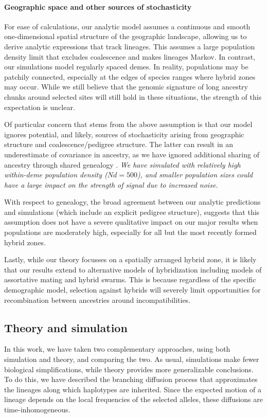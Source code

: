 \documentclass[11pt,letterpaper]{article}
\newcommand{\alisa}[1]{{\em \color{red} #1}}
\begin{document}
\paragraph{Geographic space and other sources of stochasticity}
For ease of calculations, our analytic model assumes a continuous and smooth one-dimensional spatial structure of the geographic landscape, allowing us to derive analytic expressions that track lineages. 
This assumes a large population density limit that excludes coalescence and makes lineages Markov.  
In contrast, our simulations model regularly spaced demes. 
In reality, populations may be patchily connected, especially at the edges of species ranges where hybrid zones may occur. 
While we still believe that the genomic signature of long ancestry chunks around selected sites will still hold in these situations, the strength of this expectation is unclear. 

Of particular concern that stems from the above assumption is that our model ignores potential, and likely, sources of stochasticity arising from geographic structure and coalescence/pedigree structure. The latter can result in an underestimate of covariance in ancestry, as we have ignored additional sharing of ancestry through shared genealogy \citep{Liang2014}. \alisa{We have simulated with relatively high within-deme population density ($Nd=500$), and smaller population sizes could have a large impact on the strength of signal due to increased noise.}

With respect to genealogy, the broad agreement between our analytic predictions and simulations (which include an explicit pedigree structure), suggests that this assumption does not have a severe qualitative impact on our major results when populations are moderately high, especially for all but the most recently formed hybrid zones. 

Lastly, while our theory focusses on a spatially arranged hybrid zone, it is likely that our results extend to alternative models of hybridization including models of assortative mating and hybrid swarms. This is because regardless of the specific demographic model, selection against hybrids will severely limit opportunities for recombination between ancestries around incompatibilities.




\subsection*{Theory and simulation}
In this work, we have taken two complementary approaches,
using both simulation and theory, and comparing the two.
As usual, simulations make fewer biological simplifications,
while theory provides more generalizable conclusions.
To do this, we have described the branching diffusion process that approximates
the lineages along which haplotypes are inherited.
Since the expected motion of a lineage depends on the local frequencies of the selected alleles,
these diffusions are time-inhomogeneous.
\end{document}
